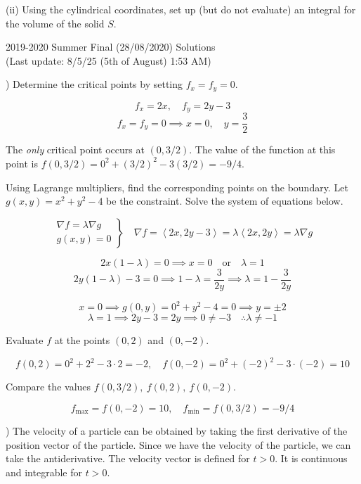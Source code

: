 \documentclass{article}
\begin{document}
\hfill

(ii) Using the cylindrical coordinates, set up (but do not evaluate) an integral for the volume of the solid $S$.

\newpage

\begin{center}
2019-2020 Summer Final (28/08/2020) Solutions\\
(Last update: 8/5/25 (5th of August) 1:53 AM)
\end{center}

) Determine the critical points by setting $f_x=f_y=0$.

\[f_x=2x,\quad f_y=2y-3\]
\[f_x=f_y=0\implies x=0,\quad y=\frac32\]

\noindent The \textit{only} critical point occurs at $(0,3/2)$. The value of the function at this point is $f(0, 3/2) = 0^2 + (3/2)^2 -3(3/2)=-9/4$.

\hfill

\noindent Using Lagrange multipliers, find the corresponding points on the boundary. Let $g(x,y)=x^2+y^2-4$ be the constraint. Solve the system of equations below.

\[
\left.
\begin{array}{ll}
\displaystyle\nabla f =\lambda \nabla g\\
\displaystyle g(x,y) = 0
\end{array}
\right\}\quad
\nabla f = \left\langle2x,2y-3\right\rangle=\lambda\left\langle2x,2y\right\rangle= \lambda\nabla g
\]

\[2x(1-\lambda)=0\implies x=0\quad\text{or}\quad\lambda=1\]
\[2y(1-\lambda)-3=0\implies1-\lambda=\frac3{2y}\implies\lambda=1-\frac3{2y}\]

\[x=0\implies g(0,y)=0^2+y^2-4=0\implies y=\pm2\]
\[\lambda=1\implies 2y-3=2y\implies 0\neq-3\quad\therefore\lambda\neq-1\]

\hfill

\noindent Evaluate $f$ at the points $(0,2)$ and $(0,-2)$.

\[f(0,2)=0^2+2^2-3\cdot2=-2,\quad f(0,-2)=0^2+(-2)^2-3\cdot(-2)=10\]

\hfill

\noindent Compare the values $f(0,3/2),\:f(0,2),\:f(0,-2)$.

\[\boxed{f_{\text{max}}=f(0,-2)=10,\quad f_{\text{min}}=f(0,3/2)=-9/4}\]

\hfill

) The velocity of a particle can be obtained by taking the first derivative of the position vector of the particle. Since we have the velocity of the particle, we can take the antiderivative. The velocity vector is defined for $t>0$. It is continuous and integrable for $t>0$.
\end{document}

